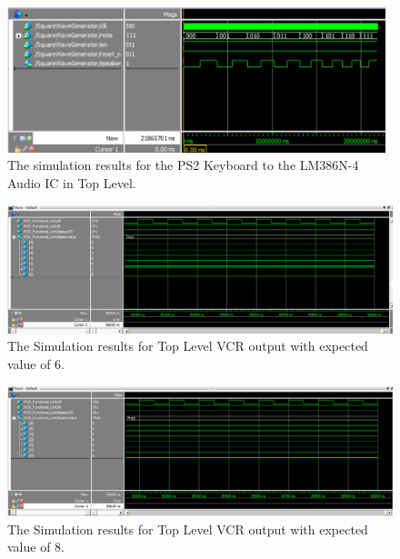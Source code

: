 \documentclass[a4paper]{article}
\begin{document}
\begin{figure}[h]
  \centering
    \includegraphics[width=0.98\textwidth]{sims/square_wave_generator/SquareWaveGenerator.png}
	\caption{The simulation results for the PS2 Keyboard to the LM386N-4 Audio IC in Top Level.}
    \label{fig:top-level-sim}
\end{figure}


\begin{figure}[t]
  \centering
  \includegraphics[width=.98\textwidth]{sims/vcr_testing/functionalUnittest/FunctionalUnitTest_6.png}
  \caption{The Simulation results for Top Level VCR output with expected value of 6.}
  \label{fig:top-level-block-1}
\end{figure}

\begin{figure}[t]
  \centering
  \includegraphics[width=.98\textwidth]{sims/vcr_testing/functionalUnittest/FunctionalUnitTest_8.png}
  \caption{The Simulation results for Top Level VCR output with expected value of 8.}
  \label{fig:top-level-block-1}
\end{figure}


\FloatBarrier
\end{document}
